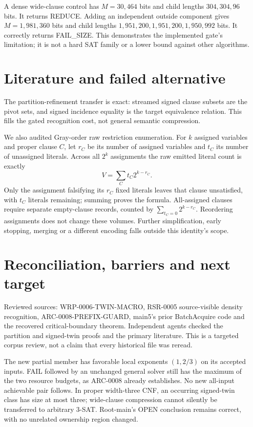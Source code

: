 \documentclass[11pt]{article}
\begin{document}
A dense wide-clause control has $M=30,464$ bits and child lengths
$304,304,96$ bits. It returns REDUCE. Adding an independent outside
component gives $M=1,981,360$ bits and child lengths
$1,951,200,1,951,200,1,950,992$ bits. It correctly returns FAIL\_SIZE.
This demonstrates the implemented gate's limitation; it is not a hard
SAT family or a lower bound against other algorithms.

\section{Literature and failed alternative}
The partition-refinement transfer is exact: streamed signed clause
subsets are the pivot sets, and signed incidence equality is the target
equivalence relation. This fills the gated recognition cost, not general
semantic compression.

We also audited Gray-order raw restriction enumeration. For $k$ assigned
variables and proper clause $C$, let $r_C$ be its number of assigned
variables and $t_C$ its number of unassigned literals. Across all $2^k$
assignments the raw emitted literal count is exactly
\[
 V=\sum_C t_C2^{k-r_C}.
\]
Only the assignment falsifying its $r_C$ fixed literals leaves that clause
unsatisfied, with $t_C$ literals remaining; summing proves the formula.
All-assigned clauses require separate empty-clause records, counted by
$\sum_{t_C=0}2^{k-r_C}$. Reordering assignments does not change these
volumes. Further simplification, early stopping, merging or a different
encoding falls outside this identity's scope.

\section{Reconciliation, barriers and next target}
Reviewed sources: WRP-0006-TWIN-MACRO, RSR-0005 source-visible density
recognition, ARC-0008-PREFIX-GUARD, main5's prior BatchAcquire code and
the recovered critical-boundary theorem. Independent agents checked the
partition and signed-twin proofs and the primary literature. This is a
targeted corpus review, not a claim that every historical file was reread.

The new partial member has favorable local exponents $(1,2/3)$ on its
accepted inputs. FAIL followed by an unchanged general solver still has
the maximum of the two resource budgets, as ARC-0008 already establishes.
No new all-input achievable pair follows. In proper width-three CNF,
an occurring signed-twin class has size at most three; wide-clause
compression cannot silently be transferred to arbitrary 3-SAT.
Root-main's OPEN conclusion remains correct, with no unrelated ownership
region changed.
\end{document}
